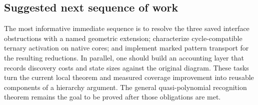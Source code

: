 \subsection{Suggested next sequence of work}
The most informative immediate sequence is to resolve the three saved
interface obstructions with a named geometric extension; characterize
cycle-compatible ternary activation on native cores; and implement marked
pattern transport for the resulting reductions.  In parallel, one should
build an accounting layer that records discovery costs and state sizes
against the original diagram.  These tasks turn the current local theorem
and measured coverage improvement into reusable components of a hierarchy
argument.  The general quasi-polynomial recognition theorem remains the
goal to be proved after those obligations are met.
